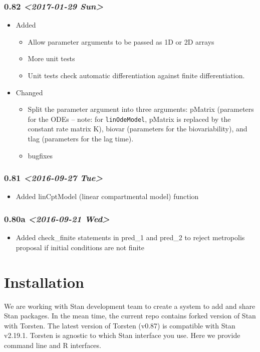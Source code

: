 \documentclass[11pt, reqno, oneside]{amsbook}
\numberwithin{equation}{chapter}
\numberwithin{figure}{chapter}
\numberwithin{table}{chapter}
\theoremstyle{remark}
\begin{document}
\subsection{0.82 \textit{<2017-01-29 Sun>}}
\label{sec:org5f4767d}
\begin{itemize}
\item Added
\label{sec:org40766af}
\begin{itemize}
\item Allow parameter arguments to be passed as 1D or 2D arrays
\item More unit tests
\item Unit tests check automatic differentiation against finite differentiation.
\end{itemize}

\item Changed
\label{sec:orgc728cac}
\begin{itemize}
\item Split the parameter argument into three arguments: pMatrix
(parameters for the ODEs -- note: for \texttt{linOdeModel}, pMatrix
is replaced by the constant rate matrix K), biovar
(parameters for the biovariability), and tlag (parameters
for the lag time).
\item bugfixes
\end{itemize}
\end{itemize}

\subsection{0.81 \textit{<2016-09-27 Tue>}}
\label{sec:org03fc819}
\begin{itemize}
\item Added
\label{sec:orgd3a6825}
linCptModel (linear compartmental model) function
\end{itemize}

\subsection{0.80a \textit{<2016-09-21 Wed>}}
\label{sec:orgcfcda11}
\begin{itemize}
\item Added
\label{sec:org61d8c4f}
check\_finite statements in pred\_1 and pred\_2 to reject metropolis proposal if initial conditions are not finite
\end{itemize}

\chapter{Installation}
\label{sec:orgb2982e0}
We are working with Stan development team to create a
system to add and share Stan packages. In the mean time,
the current repo contains forked version of Stan with
Torsten. The latest version of Torsten (v0.87) is
compatible with Stan v2.19.1. Torsten is agnostic to which
Stan interface you use. Here we provide command line and R
interfaces.
\end{document}
